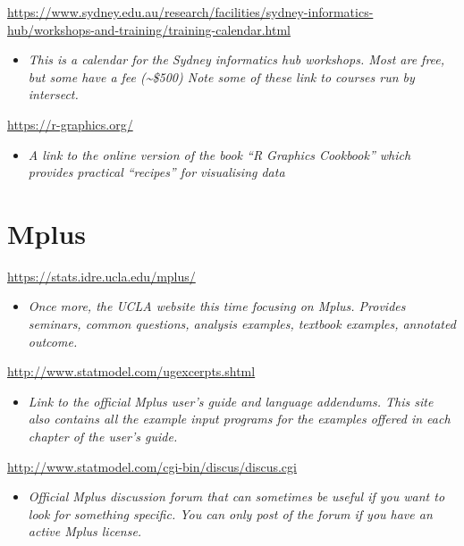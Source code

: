 \documentclass[
]{book}
\providecommand{\tightlist}{%
  \setlength{\itemsep}{0pt}\setlength{\parskip}{0pt}}
\begin{document}
\url{https://www.sydney.edu.au/research/facilities/sydney-informatics-hub/workshops-and-training/training-calendar.html}

\begin{itemize}
\tightlist
\item
  \emph{This is a calendar for the Sydney informatics hub workshops. Most are free, but some have a fee (\textasciitilde\$500) Note some of these link to courses run by intersect.}
\end{itemize}

\url{https://r-graphics.org/}

\begin{itemize}
\tightlist
\item
  \emph{A link to the online version of the book ``R Graphics Cookbook'' which provides practical ``recipes'' for visualising data}
\end{itemize}

\hypertarget{mplus}{%
\section{Mplus}\label{mplus}}

\url{https://stats.idre.ucla.edu/mplus/}

\begin{itemize}
\tightlist
\item
  \emph{Once more, the UCLA website this time focusing on Mplus. Provides seminars, common questions, analysis examples, textbook examples, annotated outcome.}
\end{itemize}

\url{http://www.statmodel.com/ugexcerpts.shtml}

\begin{itemize}
\tightlist
\item
  \emph{Link to the official Mplus user's guide and language addendums. This site also contains all the example input programs for the examples offered in each chapter of the user's guide.}
\end{itemize}

\url{http://www.statmodel.com/cgi-bin/discus/discus.cgi}

\begin{itemize}
\tightlist
\item
  \emph{Official Mplus discussion forum that can sometimes be useful if you want to look for something specific. You can only post of the forum if you have an active Mplus license.}
\end{itemize}
\end{document}
